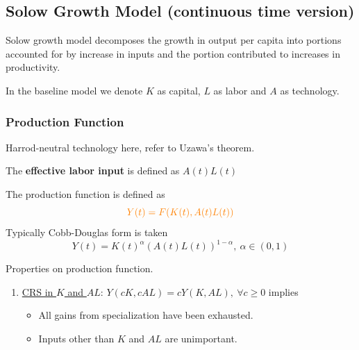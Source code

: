 \documentclass[]{article}
\begin{document}
        \subsection{Solow Growth Model (continuous time version)}
            \par Solow growth model decomposes the growth in output per capita into portions accounted for by increase in inputs and the portion contributed to increases in productivity.
            \par In the baseline model we denote $K$ as capital, $L$ as labor and $A$ as technology.
            
        \subsubsection{Production Function}
            \begin{remark}
                Harrod-neutral technology here, refer to Uzawa's theorem.
            \end{remark}
            \begin{definition}
                The \textbf{effective labor input} is defined as $A(t)L(t)$
            \end{definition}
            
            \begin{definition}
                The production function is defined as
	            \begin{equation}
                    \textcolor{orange}{Y(t) = F(K(t), A(t)L(t))}
	            \end{equation}
                Typically Cobb-Douglas form is taken
                \[
                    Y(t) = K(t)^\alpha (A(t)L(t))^{1 - \alpha},\ \alpha \in (0, 1)
                \]
            \end{definition}
            
            \begin{property} Properties on production function.
                \begin{enumerate}
                    \item \ul{CRS in $K$ and $AL$}: $Y(cK, cAL) = cY(K, AL),\ \forall c \geq 0$ implies
                        \begin{itemize}
                            \item All gains from specialization have been exhausted.
                            \item Inputs other than $K$ and $AL$ are unimportant.
                        \end{itemize}
                \end{enumerate}
            \end{property}
            
\end{document}
